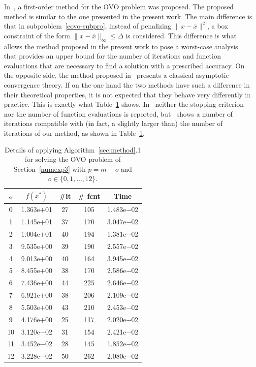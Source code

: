 \documentclass[11pt]{article}
\begin{document}
In~\cite{dunder1}, a first-order method for the OVO problem was proposed. The proposed method is similar to the one presented in the present work. The main difference is that in subproblem~\eqref{covo-subpro}, instead of penalizing $\|x-\bar x\|^2$, a box constraint of the form $\|x-\bar x\|_{\infty} \leq \Delta$ is considered. This difference is what allows the method proposed in the present work to pose a worst-case analysis that provides an upper bound for the number of iterations and function evaluations that are necessary to find a solution with a prescribed accuracy. On the opposite side, the method proposed in~\cite{dunder1} presents a classical asymptotic convergence theory. If on the one hand the two methods have such a difference in their theoretical properties, it is not expected that they behave very differently in practice. This is exactly what Table~\ref{tab4} shows. In~\cite{dunder1} neither the stopping criterion nor the number of function evaluations is reported, but~\cite[p.~398, Table~2]{dunder1} shows a number of iterations compatible with (in fact, a slightly larger than) the number of iterations of our method, as shown in Table~\ref{tab4}.


\begin{table}[ht!]
\begin{center}
\begin{tabular}{|c|c|c|c|c|}
\hline
$o$ & $f(x^*)$ & \#it & \# fcnt & Time\\
\hline
\hline
 0 &  1.363e$+$01 &  27 &  105 &  1.483e$-$02 \\
 1 &  1.145e$+$01 &  37 &  170 &  3.047e$-$02 \\
 2 &  1.004e$+$01 &  40 &  194 &  1.381e$-$02 \\
 3 &  9.535e$+$00 &  39 &  190 &  2.557e$-$02 \\
 4 &  9.013e$+$00 &  40 &  164 &  3.945e$-$02 \\
 5 &  8.455e$+$00 &  38 &  170 &  2.586e$-$02 \\
 6 &  7.436e$+$00 &  44 &  225 &  2.646e$-$02 \\
 7 &  6.921e$+$00 &  38 &  206 &  2.109e$-$02 \\
 8 &  5.503e$+$00 &  43 &  210 &  2.453e$-$02 \\
 9 &  4.176e$+$00 &  25 &  117 &  2.020e$-$02 \\
10 &  3.120e$-$02 &  31 &  154 &  2.421e$-$02 \\
11 &  3.452e$-$02 &  28 &  145 &  1.852e$-$02 \\
12 &  3.228e$-$02 &  50 &  262 &  2.080e$-$02 \\
\hline
\end{tabular}
\end{center}
\caption{Details of applying Algorithm~\ref{sec:method}.1 for solving the OVO problem of Section~\ref{numexp3} with $p=m-o$ and $o \in \{0, 1,\dots,12\}$.}
\label{tab4}
\end{table}
\end{document}
